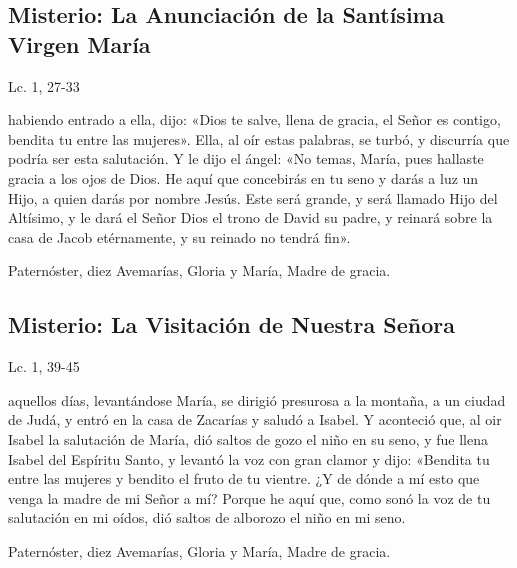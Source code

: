 \documentclass[./main.tex]{subfiles}
\newcounter{joyful-counter}
\begin{document}
\subsection*{ Misterio: La Anunciación de la Santísima Virgen María}
\begin{flushright}
      {\color{red}Lc. 1, 27-33}
\end{flushright}
habiendo entrado a ella, dijo: «Dios te salve, llena de gracia, el Señor es contigo, bendita tu entre las mujeres». Ella, al oír estas palabras, se turbó, 
y discurría que podría ser esta salutación. Y le dijo el ángel: «No temas, María, pues hallaste gracia a los ojos de Dios. He aquí que concebirás en tu seno y darás a luz un Hijo, 
a quien darás por nombre Jesús. Este será grande, y será llamado Hijo del Altísimo, y le dará el Señor Dios el trono de David su padre, y reinará sobre la casa de Jacob etérnamente, 
y su reinado no tendrá fin».

\begin{center}
      Paternóster, diez Avemarías, Gloria y María, Madre de gracia.
\end{center}

\subsection*{ Misterio: La Visitación de Nuestra Señora}
\begin{flushright}
      {\color{red}Lc. 1, 39-45}
\end{flushright}
 aquellos días, levantándose María, se dirigió presurosa a la montaña, a un ciudad de Judá, y entró en la casa de Zacarías y saludó a Isabel. 
Y aconteció que, al oir Isabel la salutación de María, dió saltos de gozo el niño en su seno, y fue llena Isabel del Espíritu Santo, y levantó la voz con gran clamor y dijo: 
«Bendita tu entre las mujeres y bendito el fruto de tu vientre. ¿Y de dónde a mí esto que venga la madre de mi Señor a mí? Porque he aquí que, como sonó la voz de tu salutación en mi oídos, 
dió saltos de alborozo el niño en mi seno.

\begin{center}
      Paternóster, diez Avemarías, Gloria y María, Madre de gracia.
\end{center}

\end{document}
